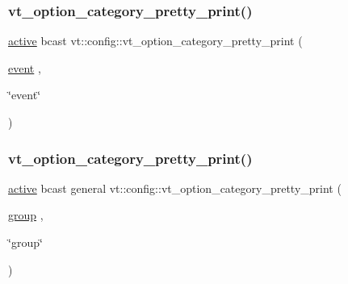 \subsubsection{\texorpdfstring{vt\+\_\+option\+\_\+category\+\_\+pretty\+\_\+print()}{vt\_option\_category\_pretty\_print()}\hspace{0.1cm}{\footnotesize\ttfamily [3/16]}}
{\footnotesize\ttfamily \hyperlink{namespacevt_1_1config_a6bd1d6215bda0d8ca02811798399f689a82f77c67af0c363709010c6df4dbd920}{active} bcast vt\+::config\+::vt\+\_\+option\+\_\+category\+\_\+pretty\+\_\+print (\begin{DoxyParamCaption}\item[{\hyperlink{namespacevt_1_1config_a6bd1d6215bda0d8ca02811798399f689a9e0b3f734ed730f6f3117f0687eda7df}{event}}]{,  }\item[{\char`\"{}event\char`\"{}}]{ }\end{DoxyParamCaption})}

\mbox{\label{namespacevt_1_1config_a0f63a89d62d66caeff4d5b7a8a760eb1}} 
\subsubsection{\texorpdfstring{vt\+\_\+option\+\_\+category\+\_\+pretty\+\_\+print()}{vt\_option\_category\_pretty\_print()}\hspace{0.1cm}{\footnotesize\ttfamily [4/16]}}
{\footnotesize\ttfamily \hyperlink{namespacevt_1_1config_a6bd1d6215bda0d8ca02811798399f689a82f77c67af0c363709010c6df4dbd920}{active} bcast general vt\+::config\+::vt\+\_\+option\+\_\+category\+\_\+pretty\+\_\+print (\begin{DoxyParamCaption}\item[{\hyperlink{namespacevt_1_1config_a6bd1d6215bda0d8ca02811798399f689a132506d2b8e888d0a91ae4470d4197c1}{group}}]{,  }\item[{\char`\"{}group\char`\"{}}]{ }\end{DoxyParamCaption})}

\mbox{\label{namespacevt_1_1config_abec888224b94cd54b72b109b3af171e7}} 
